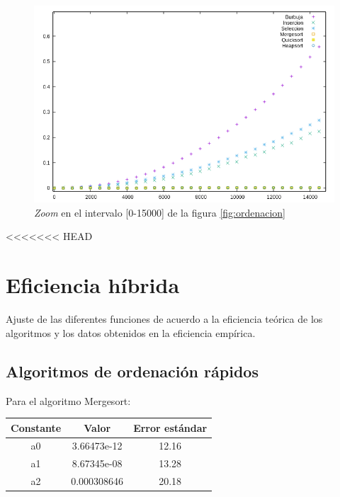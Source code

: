 \documentclass{article}
\begin{document}
	\begin{figure}[H]
		\centering
		\includegraphics[totalheight=8cm]{img/ordenacion_zoom}
		\caption{\textit{Zoom} en el intervalo [0-15000] de la figura \ref{fig:ordenacion}}
		\label{fig:ordenacion_zoom}
	\end{figure}
<<<<<<< HEAD

	\section{Eficiencia híbrida}
	Ajuste de las diferentes funciones de acuerdo a la eficiencia teórica de los algoritmos y los datos obtenidos en la eficiencia empírica.
	
	\subsection{Algoritmos de ordenación rápidos}
	
	
	Para el algoritmo Mergesort:

	\begin{longtable}{|c|c|c|}
		\hline
	 	Constante		& Valor			& Error estándar	\\ \hline
		a0              & 3.66473e-12	& 12.16 \\ \hline
		a1              & 8.67345e-08	& 13.28 \\ \hline
		a2              & 0.000308646	& 20.18 \\ \hline
	\end{longtable}
\end{document}
